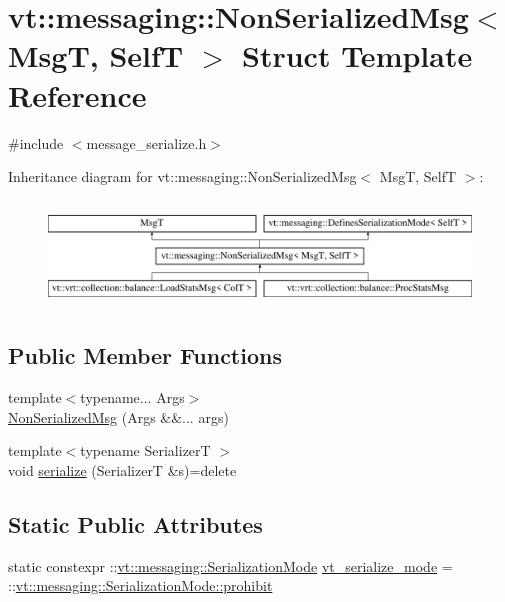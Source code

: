 \hypertarget{structvt_1_1messaging_1_1_non_serialized_msg}{}\section{vt\+:\+:messaging\+:\+:Non\+Serialized\+Msg$<$ MsgT, SelfT $>$ Struct Template Reference}
\label{structvt_1_1messaging_1_1_non_serialized_msg}


{\ttfamily \#include $<$message\+\_\+serialize.\+h$>$}

Inheritance diagram for vt\+:\+:messaging\+:\+:Non\+Serialized\+Msg$<$ MsgT, SelfT $>$\+:\begin{figure}[H]
\begin{center}
\leavevmode
\includegraphics[height=2.818792cm]{structvt_1_1messaging_1_1_non_serialized_msg}
\end{center}
\end{figure}
\subsection*{Public Member Functions}
\begin{DoxyCompactItemize}
\item 
{\footnotesize template$<$typename... Args$>$ }\\\hyperlink{structvt_1_1messaging_1_1_non_serialized_msg_aaaf8f519b382fdad6f9fab8191a2950f}{Non\+Serialized\+Msg} (Args \&\&... args)
\item 
{\footnotesize template$<$typename SerializerT $>$ }\\void \hyperlink{structvt_1_1messaging_1_1_non_serialized_msg_a2598724a040d6b6f1a343d4f2def910d}{serialize} (SerializerT \&s)=delete
\end{DoxyCompactItemize}
\subsection*{Static Public Attributes}
\begin{DoxyCompactItemize}
\item 
static constexpr \+::\hyperlink{namespacevt_1_1messaging_a436c5b9fc7f591e5978a136999cb9ef8}{vt\+::messaging\+::\+Serialization\+Mode} \hyperlink{structvt_1_1messaging_1_1_non_serialized_msg_a51b31c1f6eab5950f3586559c5d27f8a}{vt\+\_\+serialize\+\_\+mode} = \+::\hyperlink{namespacevt_1_1messaging_a436c5b9fc7f591e5978a136999cb9ef8abc56ee21f7c9d61984fde885e8ce116f}{vt\+::messaging\+::\+Serialization\+Mode\+::prohibit}
\end{DoxyCompactItemize}


